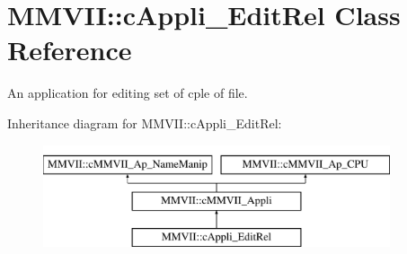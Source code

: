 \hypertarget{classMMVII_1_1cAppli__EditRel}{}\section{M\+M\+V\+II\+:\+:c\+Appli\+\_\+\+Edit\+Rel Class Reference}
\label{classMMVII_1_1cAppli__EditRel}


An application for editing set of cple of file.  


Inheritance diagram for M\+M\+V\+II\+:\+:c\+Appli\+\_\+\+Edit\+Rel\+:\begin{figure}[H]
\begin{center}
\leavevmode
\includegraphics[height=3.000000cm]{classMMVII_1_1cAppli__EditRel}
\end{center}
\end{figure}
